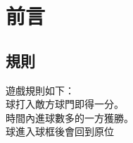 
\chapter{前言}
\renewcommand{\baselinestretch}{10.0} %
\setcounter{page}{1}  %
\fontsize{14pt}{2.5pt}\sectionef
\section{規則}

遊戲規則如下：\\
球打入敵方球門即得一分。\\
 時間內進球數多的一方獲勝。\\
球進入球框後會回到原位\\
\renewcommand{\baselinestretch}{0.5} %